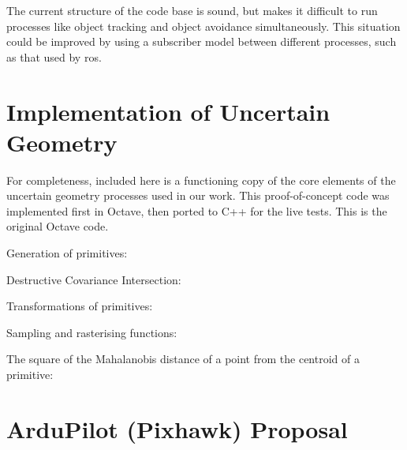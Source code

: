 \documentclass[a4paper, 11pt, titlepage]{article}
\begin{document}


  The current structure of the code base is sound, but makes it difficult to run processes like object tracking and object avoidance simultaneously.  This situation could be improved by using a subscriber model between different processes, such as that used by \gls{ros}.







\pagebreak
\renewcommand{\refname}{References}


%

\pagebreak

\printglossaries


\begin{appendices}

\section{Implementation of Uncertain Geometry}
  \label{sec:code}
  For completeness, included here is a functioning copy of the core elements of the uncertain geometry processes used in our work.  This proof-of-concept code was implemented first in Octave, then ported to C++ for the live tests.  This is the original Octave code.

  Generation of primitives:
  
  

  Destructive Covariance Intersection:
  

  Transformations of primitives:
  
  
  
  
  
  Sampling and rasterising functions:
  
  

  The square of the Mahalanobis distance of a point from the centroid of a primitive:
  
  


  \section{ArduPilot (Pixhawk) Proposal} \label{sec:PihawkProposal}
    

\end{appendices}

  
\end{document}
